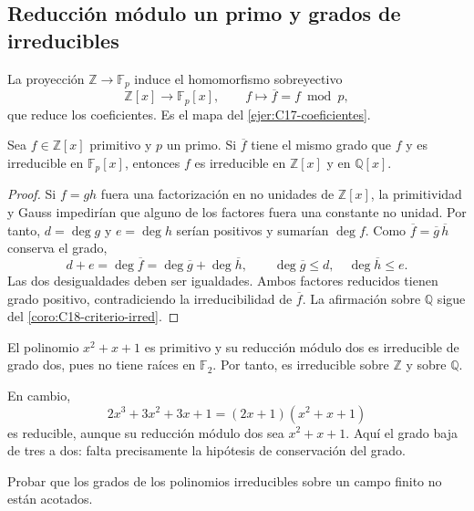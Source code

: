 \subsection{Reducción módulo un primo y grados de irreducibles}\label{tema:19-3-1}\label{tema:19-3-2}
La proyección $\mathbb Z\to\mathbb F_p$ induce el homomorfismo sobreyectivo
\[
\mathbb Z[x]\longrightarrow\mathbb F_p[x],\qquad
f\longmapsto\overline f=f\bmod p,
\]
que reduce los coeficientes. Es el mapa del \cref{ejer:C17-coeficientes}.

\begin{prop}\label{prop:C19-modular}
Sea $f\in\mathbb Z[x]$ primitivo y $p$ un primo. Si $\overline f$ tiene el mismo grado que $f$ y es irreducible en $\mathbb F_p[x]$, entonces $f$ es irreducible en $\mathbb Z[x]$ y en $\mathbb Q[x]$.
\end{prop}
\begin{proof}
Si $f=gh$ fuera una factorización en no unidades de $\mathbb Z[x]$, la primitividad y Gauss impedirían que alguno de los factores fuera una constante no unidad. Por tanto, $d=\deg g$ y $e=\deg h$ serían positivos y sumarían $\deg f$. Como $\overline f=\overline g\,\overline h$ conserva el grado,
\[
d+e=\deg\overline f=\deg\overline g+\deg\overline h,
\qquad \deg\overline g\leq d,\quad\deg\overline h\leq e.
\]
Las dos desigualdades deben ser igualdades. Ambos factores reducidos tienen grado positivo, contradiciendo la irreducibilidad de $\overline f$. La afirmación sobre $\mathbb Q$ sigue del \cref{coro:C18-criterio-irred}.
\end{proof}
\begin{ejem}
El polinomio $x^2+x+1$ es primitivo y su reducción módulo dos es irreducible de grado dos, pues no tiene raíces en $\mathbb F_2$. Por tanto, es irreducible sobre $\mathbb Z$ y sobre $\mathbb Q$.

En cambio,
\[
2x^3+3x^2+3x+1=(2x+1)(x^2+x+1)
\]
es reducible, aunque su reducción módulo dos sea $x^2+x+1$. Aquí el grado baja de tres a dos: falta precisamente la hipótesis de conservación del grado.
\end{ejem}

\begin{ejer}\label{ejer:C19-grados-finitos}
Probar que los grados de los polinomios irreducibles sobre un campo finito no están acotados.
\end{ejer}

